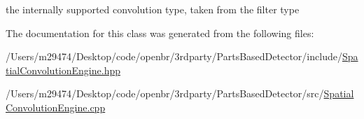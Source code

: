 the internally supported convolution type, taken from the filter type 



The documentation for this class was generated from the following files\-:\begin{DoxyCompactItemize}
\item 
/\-Users/m29474/\-Desktop/code/openbr/3rdparty/\-Parts\-Based\-Detector/include/\hyperlink{_spatial_convolution_engine_8hpp}{Spatial\-Convolution\-Engine.\-hpp}\item 
/\-Users/m29474/\-Desktop/code/openbr/3rdparty/\-Parts\-Based\-Detector/src/\hyperlink{_spatial_convolution_engine_8cpp}{Spatial\-Convolution\-Engine.\-cpp}\end{DoxyCompactItemize}
